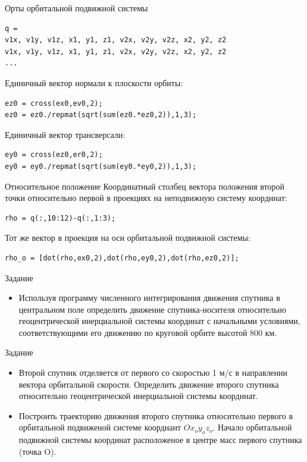 \documentclass[11pt, compress]{beamer}
\renewcommand{\emph}[1]{\textcolor{dark-blue}{#1}}
\begin{document}
\begin{frame}[fragile]{Орты орбитальной подвижной системы}
\begin{lstlisting}
q = 
v1x, v1y, v1z, x1, y1, z1, v2x, v2y, v2z, x2, y2, z2
v1x, v1y, v1z, x1, y1, z1, v2x, v2y, v2z, x2, y2, z2
...
\end{lstlisting}
Единичный вектор нормали к плоскости орбиты:
\begin{lstlisting}
ez0 = cross(ex0,ev0,2);
ez0 = ez0./repmat(sqrt(sum(ez0.*ez0,2)),1,3);
\end{lstlisting}
Единичный вектор трансверсали:
\begin{lstlisting}[firstnumber=last]
ey0 = cross(ez0,er0,2);
ey0 = ey0./repmat(sqrt(sum(ey0.*ey0,2)),1,3);
\end{lstlisting}
\end{frame}



\begin{frame}[fragile]{Относительное положение}
Координатный столбец вектора положения второй точки относительно первой в проекциях на неподвижную систему координат:
\begin{lstlisting}
rho = q(:,10:12)-q(:,1:3);
\end{lstlisting}
Тот же вектор в проекция на оси орбитальной подвижной системы:
\begin{lstlisting}
rho_o = [dot(rho,ex0,2),dot(rho,ey0,2),dot(rho,ez0,2)];
\end{lstlisting}
\end{frame}



\begin{frame}{Задание}
\begin{itemize}
  \item Используя программу численного интегрирования движения спутника в центральном поле определить движение спутника-носителя относительно геоцентрической инерциальной системы координат с начальными условиями, соответствующими его движению по круговой орбите высотой 800 км.
\end{itemize}
\end{frame}

\begin{frame}{Задание}
\begin{itemize}
  \item Второй спутник отделяется от первого со скоростью 1 м/с в направлении вектора орбитальной скорости. Определить движение второго спутника относительно геоцентрической инерциальной системы координат.
  \item Построить траекторию движения второго спутника \emph{относительно} первого в орбитальной подвиженой системе коордиант $Ox_oy_oz_o$. Начало орбитальной подвижной системы координат расположеное в центре масс первого спутника (точка O). 
\end{itemize}
\end{frame}
\end{document}
